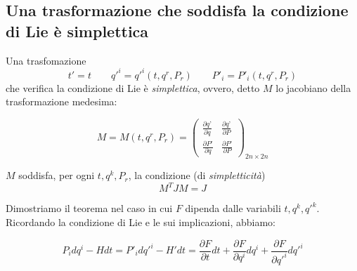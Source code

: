 \subsection{Una trasformazione che soddisfa la condizione di Lie è simplettica}
\begin{theorem}
Una trasfomazione
\begin{equation*}
 t' = t \qquad q'^i = q'^i (t, q^r, P_r) \qquad P'_i = P'_i (t, q^r, P_r)
\end{equation*}
che verifica la condizione di Lie è \textit{simplettica}, ovvero, detto $ M $ lo jacobiano della trasformazione medesima:

\begin{equation} \label{eq:eq8_condlie}
M = M (t, q^r, P_r) = \left( \begin{array}{cc}
\frac{\partial \textit{q'}}{\partial \textit{q}} & \frac{\partial \textit{q'}}{\partial \textit{P}} \\ 
\frac{\partial \textit{P'}}{\partial \textit{q}} & \frac{\partial \textit{P'}}{\partial \textit{P}}
\end{array} \right)_{2n \times 2n}
\end{equation}

$ M $ soddisfa, per ogni $ t, q^k, P_r $, la condizione (di \textit{simpletticità})
\begin{equation} \label{eq:eq9_condlie}
M^T J M = J
\end{equation}
\end{theorem}

\hphantom{~}

Dimostriamo il teorema nel caso in cui $ F $ dipenda dalle variabili $ t, q^k, q'^k $. Ricordando la condizione di Lie e le sui implicazioni, abbiamo:

\begin{equation*}
P_i dq^i - H dt = P'_i dq'^i - H' dt = \frac{\partial F}{\partial t} dt + \frac{\partial F}{\partial q^i} dq^i + \frac{\partial F}{\partial q'^i} dq'^i
\end{equation*}


